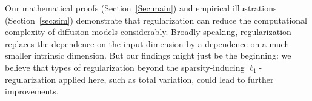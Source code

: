 
Our mathematical proofs (Section~\ref{Sec:main}) and empirical illustrations (Section~\ref{sec:sim}) demonstrate that regularization can reduce the computational complexity of diffusion models considerably. 
Broadly speaking,
regularization replaces the dependence on the input dimension by a dependence on a much smaller intrinsic dimension.
But our findings might just be the beginning: we believe that types of regularization beyond the sparsity-inducing $\ell_1$-regularization applied here, such as total variation, could lead to further improvements.



